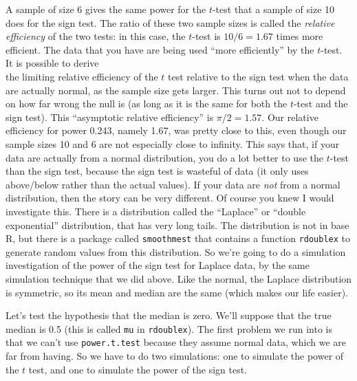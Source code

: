 \documentclass[]{tufte-book}
\theoremstyle{definition}
\theoremstyle{definition}
\theoremstyle{definition}
\theoremstyle{remark}
\begin{document}
A sample of size 6 gives the same power for the \(t\)-test that a sample
of size 10 does for the sign test. The ratio of these two sample sizes
is called the \emph{relative efficiency} of the two tests: in this case,
the \(t\)-test is \(10/6=1.67\) times more efficient. The data that you
have are being used ``more efficiently'' by the \(t\)-test. It is
possible to derive
\\
the limiting relative efficiency of the \(t\) test relative to the sign
test when the data are actually normal, as the sample size gets larger.
This turns out not to depend on how far wrong the null is (as long as it
is the same for both the \(t\)-test and the sign test). This
``asymptotic relative efficiency'' is \(\pi/2=1.57\). Our relative
efficiency for power 0.243, namely 1.67, was pretty close to this, even
though our sample sizes 10 and 6 are not especially close to infinity.
This says that, if your data are actually from a normal distribution,
you do a lot better to use the \(t\)-test than the sign test, because
the sign test is wasteful of data (it only uses above/below rather than
the actual values). If your data are \emph{not} from a normal
distribution, then the story can be very different. Of course you knew I
would investigate this. There is a distribution called the ``Laplace''
or ``double exponential'' distribution, that has very long tails.
The distribution is not in base R, but there is a package called
\texttt{smoothmest} that contains a function \texttt{rdoublex} to
generate random values from this distribution. So we're going to do a
simulation investigation of the power of the sign test for Laplace data,
by the same simulation technique that we did above. Like the normal, the
Laplace distribution is symmetric, so its mean and median are the same
(which makes our life easier).

Let's test the hypothesis that the median is zero. We'll suppose that
the true median is 0.5 (this is called \texttt{mu} in
\texttt{rdoublex}). The first problem we run into is that we can't use
\texttt{power.t.test} because they assume normal data, which we are far
from having. So we have to do two simulations: one to simulate the power
of the \(t\) test, and one to simulate the power of the sign test.
\end{document}
